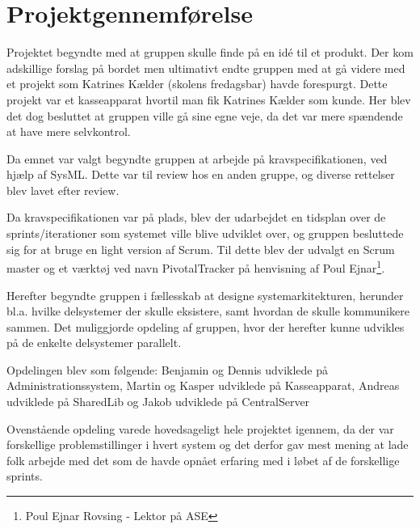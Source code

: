 \section{Projektgennemførelse}
Projektet begyndte med at gruppen skulle finde på en idé til et produkt. Der kom adskillige forslag på bordet men ultimativt endte gruppen med at gå videre med et projekt som Katrines Kælder (skolens fredagsbar) havde forespurgt. Dette projekt var et kasseapparat hvortil man fik Katrines Kælder som kunde. Her blev det dog besluttet at gruppen ville gå sine egne veje, da det var mere spændende at have mere selvkontrol.

Da emnet var valgt begyndte gruppen at arbejde på kravspecifikationen, ved hjælp af SysML. Dette var til review hos en anden gruppe, og diverse rettelser blev lavet efter review.

Da kravspecifikationen var på plads, blev der udarbejdet en tidsplan over de sprints/iterationer som systemet ville blive udviklet over, og gruppen besluttede sig for at bruge en light version af Scrum. Til dette blev der udvalgt en Scrum master og et værktøj ved navn PivotalTracker på henvisning af Poul Ejnar\footnote{Poul Ejnar Rovsing - Lektor på ASE}.

Herefter begyndte gruppen i fællesskab at designe systemarkitekturen, herunder bl.a. hvilke delsystemer der skulle eksistere, samt hvordan de skulle kommunikere sammen. Det muliggjorde opdeling af gruppen, hvor der herefter kunne udvikles på de enkelte delsystemer parallelt.

Opdelingen blev som følgende: Benjamin og Dennis udviklede på Administrationssystem, Martin og Kasper udviklede på Kasseapparat, Andreas udviklede på SharedLib og Jakob udviklede på CentralServer

Ovenstående opdeling varede hovedsageligt hele projektet igennem, da der var forskellige problemstillinger i hvert system og det derfor gav mest mening at lade folk arbejde med det som de havde opnået erfaring med i løbet af de forskellige sprints.